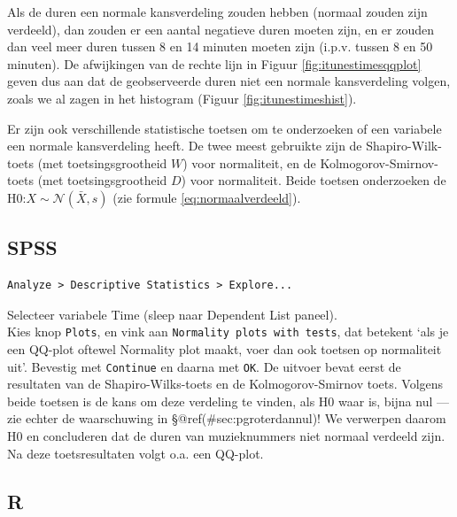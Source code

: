 \documentclass[
]{book}
\newenvironment{Shaded}{\begin{snugshade}}{\end{snugshade}}
\newcommand{\CommentTok}[1]{\textcolor[rgb]{0.56,0.35,0.01}{\textit{#1}}}
\newcommand{\DataTypeTok}[1]{\textcolor[rgb]{0.13,0.29,0.53}{#1}}
\newcommand{\DecValTok}[1]{\textcolor[rgb]{0.00,0.00,0.81}{#1}}
\newcommand{\KeywordTok}[1]{\textcolor[rgb]{0.13,0.29,0.53}{\textbf{#1}}}
\newcommand{\NormalTok}[1]{#1}
\newcommand{\OperatorTok}[1]{\textcolor[rgb]{0.81,0.36,0.00}{\textbf{#1}}}
\newcommand{\OtherTok}[1]{\textcolor[rgb]{0.56,0.35,0.01}{#1}}
\newcommand{\StringTok}[1]{\textcolor[rgb]{0.31,0.60,0.02}{#1}}
\begin{document}
Als de duren een normale kansverdeling zouden hebben (normaal zouden
zijn verdeeld), dan zouden er een aantal negatieve duren moeten zijn, en
er zouden dan veel meer duren tussen 8 en 14 minuten moeten zijn (i.p.v.
tussen 8 en 50 minuten). De afwijkingen van de rechte lijn in
Figuur \ref{fig:itunestimesqqplot} geven dus aan dat de geobserveerde
duren niet een normale kansverdeling volgen, zoals we al zagen in het
histogram (Figuur \ref{fig:itunestimeshist}).

Er zijn ook verschillende statistische toetsen om te onderzoeken of een
variabele een normale kansverdeling heeft. De twee meest gebruikte zijn
de Shapiro-Wilk-toets (met toetsingsgrootheid \(W\)) voor normaliteit, en
de Kolmogorov-Smirnov-toets (met toetsingsgrootheid \(D\)) voor
normaliteit. Beide toetsen onderzoeken de
H0:\(X\sim\mathcal{N}(\bar{X},s)\) (zie
formule \eqref{eq:normaalverdeeld}).

\hypertarget{spss-4}{%
\subsection{SPSS}\label{spss-4}}

\begin{verbatim}
Analyze > Descriptive Statistics > Explore...
\end{verbatim}

Selecteer variabele Time (sleep naar Dependent List paneel).\\
Kies knop \texttt{Plots}, en vink aan \texttt{Normality\ plots\ with\ tests}, dat
betekent `als je een QQ-plot oftewel Normality plot maakt, voer dan ook toetsen
op normaliteit uit'. Bevestig met \texttt{Continue} en daarna met \texttt{OK}. De
uitvoer bevat eerst de resultaten van de Shapiro-Wilks-toets en de
Kolmogorov-Smirnov toets. Volgens beide toetsen is de kans om deze
verdeling te vinden, als H0 waar is, bijna nul --- zie echter de
waarschuwing in
§@ref(\#sec:pgroterdannul)! We verwerpen daarom H0 en concluderen
dat de duren van muzieknummers niet normaal verdeeld zijn. Na deze
toetsresultaten volgt o.a. een QQ-plot.

\hypertarget{r-5}{%
\subsection{R}\label{r-5}}

\begin{Shaded}
\end{Shaded}
\end{document}
